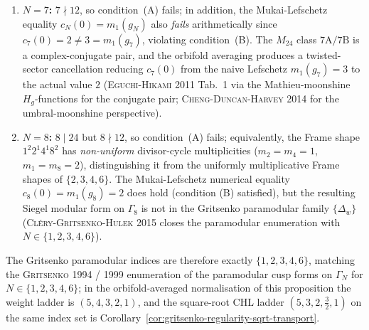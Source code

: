 \begin{proposition}
\begin{enumerate}[label=\textup{(\arabic*)}]
 $5 \nmid 12$, placing it outside the paramodular divisor-support
 structure\textup{).} The Mukai-Lefschetz numerical equality
 $c_5(0) = m_1(g_5) = 4$ does hold \textup{(}condition (B) numerically
 satisfied; but 5 is not a divisor of 12, so the paramodular Borcherds
 lift does not produce a cusp form in the Gritsenko family\textup{)},
 yet the Borcherds-lift output is not a paramodular form on $\Gamma_5$
 at index $1$ in the Gritsenko normalisation
 \textup{(}\textsc{Cl\'ery-Gritsenko-Hulek 2015} Section~3 explicitly
 excludes $N \in \{5, 7\}$ from the paramodular Borcherds-lift
 census\textup{).}
 \item \textbf{$N = 7$:} $7 \nmid 12$, so condition~(A) fails; in
 addition, the Mukai-Lefschetz equality $c_N(0) = m_1(g_N)$ also
 \emph{fails} arithmetically since $c_7(0) = 2 \ne 3 = m_1(g_7)$,
 violating condition~(B). The $M_{24}$ class $7\mathrm{A}/7\mathrm{B}$
 is a complex-conjugate pair, and the orbifold averaging produces a
 twisted-sector cancellation reducing $c_7(0)$ from the naive Lefschetz
 $m_1(g_7) = 3$ to the actual value $2$
 \textup{(}\textsc{Eguchi-Hikami 2011} Tab.~1 via the Mathieu-moonshine
 $H_g$-functions for the conjugate pair;
 \textsc{Cheng-Duncan-Harvey 2014} for the umbral-moonshine
 perspective\textup{).}
 \item \textbf{$N = 8$:} $8 \mid 24$ but $8 \nmid 12$, so condition~(A)
 fails; equivalently, the Frame shape $1^2 2^1 4^1 8^2$ has
 \emph{non-uniform} divisor-cycle multiplicities
 ($m_2 = m_4 = 1$, $m_1 = m_8 = 2$), distinguishing it from the
 uniformly multiplicative Frame shapes of $\{2, 3, 4, 6\}$. The
 Mukai-Lefschetz numerical equality $c_8(0) = m_1(g_8) = 2$ does hold
 (condition (B) satisfied), but the resulting Siegel modular form on
 $\Gamma_8$ is not in the Gritsenko paramodular family $\{\Delta_w\}$
 \textup{(}\textsc{Cl\'ery-Gritsenko-Hulek 2015} closes the paramodular
 enumeration with $N \in \{1, 2, 3, 4, 6\}$\textup{).}
\end{enumerate}
The Gritsenko paramodular indices are therefore exactly $\{1, 2, 3, 4, 6\}$,
matching the \textsc{Gritsenko 1994 / 1999} enumeration of the
paramodular cusp forms on $\Gamma_N$ for $N \in \{1, 2, 3, 4, 6\}$;
in the orbifold-averaged normalisation of this proposition the weight
ladder is $(5, 4, 3, 2, 1)$, and the square-root CHL ladder
$(5, 3, 2, \tfrac32, 1)$ on the same index set is
Corollary~\ref{cor:gritsenko-regularity-sqrt-transport}.
\end{proposition}

